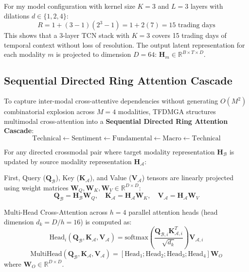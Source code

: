 For my model configuration with kernel size $K = 3$ and $L = 3$ layers with dilations $d \in \{1, 2, 4\}$:
\begin{equation}
R = 1 + (3 - 1)(2^3 - 1) = 1 + 2(7) = 15 \text{ trading days}
\end{equation}
This shows that a 3-layer TCN stack with $K=3$ covers 15 trading days of temporal context without loss of resolution. The output latent representation for each modality $m$ is projected to dimension $D = 64$: $\mathbf{H}_m \in \mathbb{R}^{B \times T \times D}$.

\subsection{Sequential Directed Ring Attention Cascade}
\label{subsec:ch4_ring_attention}

To capture inter-modal cross-attentive dependencies without generating $O(M^2)$ combinatorial explosion across $M=4$ modalities, TFDMGA structures multimodal cross-attention into a \textbf{Sequential Directed Ring Attention Cascade}:
\begin{equation}
\text{Technical} \leftarrow \text{Sentiment} \leftarrow \text{Fundamental} \leftarrow \text{Macro} \leftarrow \text{Technical}
\end{equation}

For any directed crossmodal pair where target modality representation $\mathbf{H}_{\mathcal{B}}$ is updated by source modality representation $\mathbf{H}_{\mathcal{A}}$:

First, Query ($\mathbf{Q}_{\mathcal{B}}$), Key ($\mathbf{K}_{\mathcal{A}}$), and Value ($\mathbf{V}_{\mathcal{A}}$) tensors are linearly projected using weight matrices $\mathbf{W}_Q, \mathbf{W}_K, \mathbf{W}_V \in \mathbb{R}^{D \times D}$:
\begin{equation}
\mathbf{Q}_{\mathcal{B}} = \mathbf{H}_{\mathcal{B}} \mathbf{W}_Q, \quad \mathbf{K}_{\mathcal{A}} = \mathbf{H}_{\mathcal{A}} \mathbf{W}_K, \quad \mathbf{V}_{\mathcal{A}} = \mathbf{H}_{\mathcal{A}} \mathbf{W}_V
\end{equation}

Multi-Head Cross-Attention across $h=4$ parallel attention heads (head dimension $d_k = D/h = 16$) is computed as:
\begin{equation}
\text{Head}_i(\mathbf{Q}_{\mathcal{B}}, \mathbf{K}_{\mathcal{A}}, \mathbf{V}_{\mathcal{A}}) = \text{softmax}\left( \frac{\mathbf{Q}_{\mathcal{B},i} \mathbf{K}_{\mathcal{A},i}^T}{\sqrt{d_k}} \right) \mathbf{V}_{\mathcal{A},i}
\label{eq:ch4_cross_attention_head}
\end{equation}
\begin{equation}
\text{MultiHead}(\mathbf{Q}_{\mathcal{B}}, \mathbf{K}_{\mathcal{A}}, \mathbf{V}_{\mathcal{A}}) = \left[ \text{Head}_1 ; \text{Head}_2 ; \text{Head}_3 ; \text{Head}_4 \right] \mathbf{W}_O
\end{equation}
where $\mathbf{W}_O \in \mathbb{R}^{D \times D}$.

